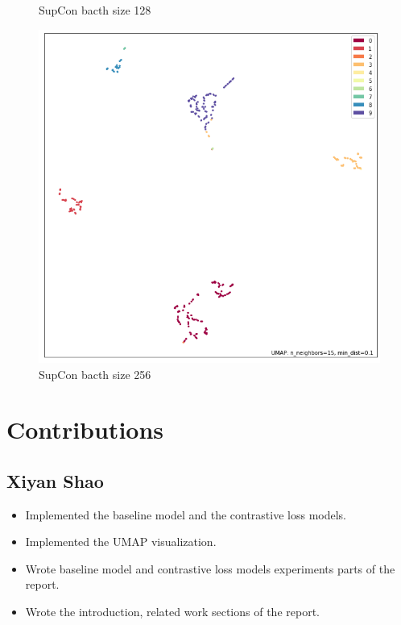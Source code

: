\documentclass{article}
\begin{document}
\begin{figure}[H]
\begin{minipage}[b]{0.33\linewidth}
            \caption{SupCon bacth size 128}
            \label{fig:figure 2.2}
        \end{minipage}
        \begin{minipage}[b]{0.33\linewidth}
            \centering
            \includegraphics[width=\textwidth]{../results/supcon_256.png}
            \caption{SupCon bacth size 256}
            \label{fig:figure 2.3}
        \end{minipage}

    \end{figure}


    \section{Contributions}

    \subsection*{Xiyan Shao}
    \begin{itemize}
        \item Implemented the baseline model and the contrastive loss models.
        \item Implemented the UMAP visualization.
        \item Wrote baseline model and contrastive loss models experiments parts of the report.
        \item Wrote the introduction, related work sections of the report.
    \end{itemize}
\end{document}
